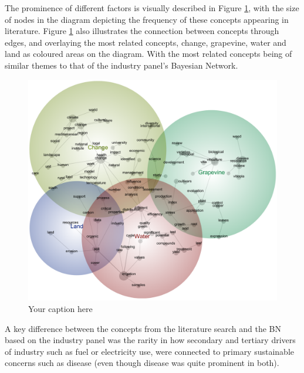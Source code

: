 The prominence of different factors is visually described in Figure \ref{fig:lexi}, with the size of nodes in the diagram depicting the frequency of these concepts appearing in literature. Figure \ref{fig:lexi} also illustrates the connection between concepts through edges, and overlaying the most related concepts, change, grapevine, water and land as coloured areas on the diagram. With the most related concepts being of similar themes to that of the industry panel's Bayesian Network.

\begin{figure}[h]
    \centering
    \includegraphics[width=\linewidth]{Winegrowing-concept-map}
    \caption{Your caption here}
    \label{fig:lexi}
\end{figure}

A key difference between the concepts from the literature search and the BN based on the industry panel was the rarity in how secondary and tertiary drivers of industry such as fuel or electricity use, were connected to primary sustainable concerns such as disease (even though disease was quite prominent in both). 

